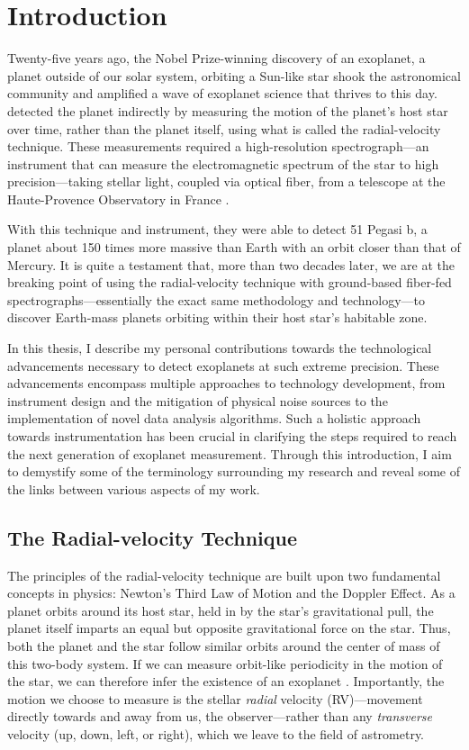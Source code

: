 \chapter{Introduction} \label{intro}

Twenty-five years ago, the Nobel Prize-winning discovery of an exoplanet, a planet outside of our solar system, orbiting a Sun-like star shook the astronomical community and amplified a wave of exoplanet science that thrives to this day. \citet{mayor_jupiter-mass_1995} detected the planet indirectly by measuring the motion of the planet's host star over time, rather than the planet itself, using what is called the radial-velocity technique. These measurements required a high-resolution spectrograph---an instrument that can measure the electromagnetic spectrum of the star to high precision---taking stellar light, coupled via optical fiber, from a telescope at the Haute-Provence Observatory in France \citep{baranne_elodie_1996}.

With this technique and instrument, they were able to detect 51 Pegasi b, a planet about 150 times more massive than Earth with an orbit closer than that of Mercury. It is quite a testament that, more than two decades later, we are at the breaking point of using the radial-velocity technique with ground-based fiber-fed spectrographs---essentially the exact same methodology and technology---to discover Earth-mass planets orbiting within their host star's habitable zone.

In this thesis, I describe my personal contributions towards the technological advancements necessary to detect exoplanets at such extreme precision. These advancements encompass multiple approaches to technology development, from instrument design and the mitigation of physical noise sources to the implementation of novel data analysis algorithms. Such a holistic approach towards instrumentation has been crucial in clarifying the steps required to reach the next generation of exoplanet measurement. Through this introduction, I aim to demystify some of the terminology surrounding my research and reveal some of the links between various aspects of my work.

\section{The Radial-velocity Technique} \label{intro:eprv}

The principles of the radial-velocity technique are built upon two fundamental concepts in physics: Newton's Third Law of Motion and the Doppler Effect. As a planet orbits around its host star, held in by the star's gravitational pull, the planet itself imparts an equal but opposite gravitational force on the star. Thus, both the planet and the star follow similar orbits around the center of mass of this two-body system. If we can measure orbit-like periodicity in the motion of the star, we can therefore infer the existence of an exoplanet \citep{lovis_radial_2011}. Importantly, the motion we choose to measure is the stellar \textit{radial} velocity (RV)---movement directly towards and away from us, the observer---rather than any \textit{transverse} velocity (up, down, left, or right), which we leave to the field of astrometry.

